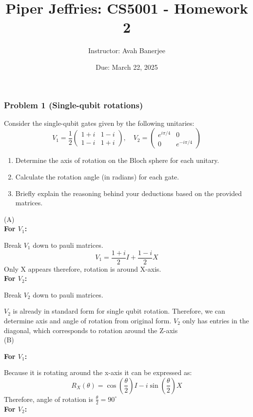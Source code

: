 \documentclass[12pt]{article}
\title{Piper Jeffries: CS5001 - Homework 2}
\author{Instructor: Avah Banerjee}
\date{Due: March 22, 2025}
\begin{document}
\maketitle

\subsubsection*{Problem 1 (Single-qubit rotations)}
Consider the single-qubit gates given by the following unitaries:
\[
    V_1 = \frac{1}{2} 
    \begin{pmatrix} 
    1 + i & 1 - i \\ 
    1 - i & 1 + i 
    \end{pmatrix}, 
    \quad
    V_2 = 
    \begin{pmatrix} 
    e^{i\pi/4} & 0 \\ 
    0 & e^{-i\pi/4} 
    \end{pmatrix}
\]
\begin{enumerate}
    \renewcommand{\labelenumi}{\Alph{enumi}.}
    \item Determine the axis of rotation on the Bloch sphere for each unitary.
    \item Calculate the rotation angle (in radians) for each gate.
    \item Briefly explain the reasoning behind your deductions based on the provided matrices.
\end{enumerate}
(A)
\\
\textbf{For $V_1$:}

    Break $V_1$ down to pauli matrices.
\[
V_1 = \frac{1+i}{2}I + \frac{1-i}{2}X
\]
Only X appears therefore, rotation is around X-axis.
\\
\textbf{For $V_2$:}

Break $V_2$ down to pauli matrices.

$V_2$ is already in standard form for single qubit rotation. Therefore, we can determine axis and angle of rotation from original form.
$V_2$ only has entries in the diagonal, which corresponds to rotation around the Z-axis
\\
(B)

\textbf{For $V_1$:}

Because it is rotating around the x-axis it can be expressed as:
\[
    R_{X}(\theta) = \cos(\frac{\theta}{2})I - i\sin (\frac{\theta}{2})X
\]
Therefore, angle of rotation is $\frac{\theta}{2} = 90^\circ $ 
\\
\textbf{For $V_2$:}
\end{document}
